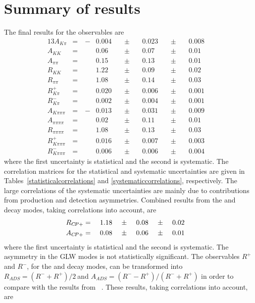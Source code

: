 \section{Summary of results}
\label{sec:cpfit:summary}

The final results for the \CP observables are  
\begin{alignat*}{13}
A_{K\pi} &= &\ -&0.004&\ &\pm&\ &0.023&\ &\pm&\ &0.008& \\
A_{KK} &= &&0.06&\ &\pm&\ &0.07&\ &\pm&\ &0.01& \\
A_{\pi\pi} &= &&0.15&\ &\pm&\ &0.13&\ &\pm&\ &0.01& \\
R_{KK} &= &&1.22&\ &\pm&\ &0.09&\ &\pm&\ &0.02& \\
R_{\pi\pi} &= &&1.08&\ &\pm&\ &0.14&\ &\pm&\ &0.03& \\
R^+_{K\pi} &= &&0.020&\ &\pm&\ &0.006&\ &\pm&\ &0.001& \\ 
R^-_{K\pi} &= &&0.002&\ &\pm&\ &0.004&\ &\pm&\ &0.001& \\
A_{K\pi\pi\pi} &= &\ -&0.013&\ &\pm&\ &0.031&\ &\pm&\ &0.009& \\
A_{\pi\pi\pi\pi} &= &&0.02&\ &\pm&\ &0.11&\ &\pm&\ &0.01& \\
R_{\pi\pi\pi\pi} &= &&1.08&\ &\pm&\ &0.13&\ &\pm&\ &0.03& \\
R^+_{K\pi\pi\pi} &= &&0.016&\ &\pm&\ &0.007&\ &\pm&\ &0.003& \\ 
R^-_{K\pi\pi\pi} &= &&0.006&\ &\pm&\ &0.006&\ &\pm&\ &0.004&
\end{alignat*}
where the first uncertainty is statistical and the second is systematic. The correlation matrices for the statistical and systematic uncertainties are given in Tables~\ref{statisticalcorrelations} and \ref{systematiccorrelations}, respectively. The large correlations of the systematic uncertainties are mainly due to contributions from production and detection asymmetries. Combined results from the \Kp\Km and \pip\pim decay modes, taking correlations into account, are
\begin{alignat*}{13}
R_{\CP+} &= &\ &1.18&\ &\pm&\ &0.08&\ &\pm&\ &0.02& \\
A_{\CP+} &= &\ &0.08&\ &\pm&\ &0.06&\ &\pm&\ &0.01&
\end{alignat*}
where the first uncertainty is statistical and the second is systematic. The asymmetry in the GLW modes is not statistically significant. The \CP observables $R^+$ and $R^-$, for the \pik and \pikpipi decay modes, can be transformed into $R_{ADS} = \left(R^- + R^+\right)/2\ $and \mbox{$A_{ADS} = \left(R^- - R^+\right)/\left(R^- + R^+\right)$} in order to compare with the results from \babar~\cite{BaBarDKstar}. These results, taking correlations into account, are
